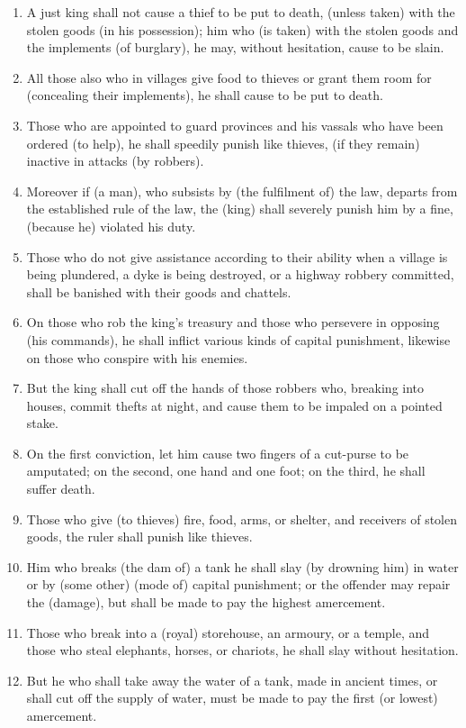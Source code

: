\begin{enumerate}
\item A just king shall not cause a thief to be put to death, (unless taken) with the stolen goods (in his possession); him who (is taken) with the stolen goods and the implements (of burglary), he may, without hesitation, cause to be slain.
\item All those also who in villages give food to thieves or grant them room for (concealing their implements), he shall cause to be put to death.
\item Those who are appointed to guard provinces and his vassals who have been ordered (to help), he shall speedily punish like thieves, (if they remain) inactive in attacks (by robbers).
\item Moreover if (a man), who subsists by (the fulfilment of) the law, departs from the established rule of the law, the (king) shall severely punish him by a fine, (because he) violated his duty.
\item Those who do not give assistance according to their ability when a village is being plundered, a dyke is being destroyed, or a highway robbery committed, shall be banished with their goods and chattels.
\item On those who rob the king's treasury and those who persevere in opposing (his commands), he shall inflict various kinds of capital punishment, likewise on those who conspire with his enemies.
\item But the king shall cut off the hands of those robbers who, breaking into houses, commit thefts at night, and cause them to be impaled on a pointed stake.
\item On the first conviction, let him cause two fingers of a cut-purse to be amputated; on the second, one hand and one foot; on the third, he shall suffer death.
\item Those who give (to thieves) fire, food, arms, or shelter, and receivers of stolen goods, the ruler shall punish like thieves.
\item Him who breaks (the dam of) a tank he shall slay (by drowning him) in water or by (some other) (mode of) capital punishment; or the offender may repair the (damage), but shall be made to pay the highest amercement.
\item Those who break into a (royal) storehouse, an armoury, or a temple, and those who steal elephants, horses, or chariots, he shall slay without hesitation.
\item But he who shall take away the water of a tank, made in ancient times, or shall cut off the supply of water, must be made to pay the first (or lowest) amercement.

\end{enumerate}
